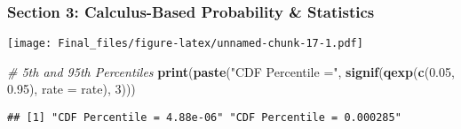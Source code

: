 \documentclass[
]{article}
\newenvironment{Shaded}{\begin{snugshade}}{\end{snugshade}}
\newcommand{\CommentTok}[1]{\textcolor[rgb]{0.56,0.35,0.01}{\textit{#1}}}
\newcommand{\DataTypeTok}[1]{\textcolor[rgb]{0.13,0.29,0.53}{#1}}
\newcommand{\DecValTok}[1]{\textcolor[rgb]{0.00,0.00,0.81}{#1}}
\newcommand{\FloatTok}[1]{\textcolor[rgb]{0.00,0.00,0.81}{#1}}
\newcommand{\KeywordTok}[1]{\textcolor[rgb]{0.13,0.29,0.53}{\textbf{#1}}}
\newcommand{\NormalTok}[1]{#1}
\newcommand{\OperatorTok}[1]{\textcolor[rgb]{0.81,0.36,0.00}{\textbf{#1}}}
\newcommand{\StringTok}[1]{\textcolor[rgb]{0.31,0.60,0.02}{#1}}
\begin{document}
\hypertarget{section-3-calculus-based-probability-statistics}{%
\subsubsection{Section 3: Calculus-Based Probability \&
Statistics}\label{section-3-calculus-based-probability-statistics}}

\begin{Shaded}
\end{Shaded}

\texttt{[image: Final\_files/figure-latex/unnamed-chunk-17-1.pdf]}

\begin{Shaded}
\begin{Highlighting}[]
\CommentTok{# 5th and 95th Percentiles }
\KeywordTok{print}\NormalTok{(}\KeywordTok{paste}\NormalTok{(}\StringTok{"CDF Percentile ="}\NormalTok{, }\KeywordTok{signif}\NormalTok{(}\KeywordTok{qexp}\NormalTok{(}\KeywordTok{c}\NormalTok{(}\FloatTok{0.05}\NormalTok{, }\FloatTok{0.95}\NormalTok{), }\DataTypeTok{rate =}\NormalTok{ rate), }\DecValTok{3}\NormalTok{)))}
\end{Highlighting}
\end{Shaded}

\begin{verbatim}
## [1] "CDF Percentile = 4.88e-06" "CDF Percentile = 0.000285"
\end{verbatim}

\begin{Shaded}
\end{Shaded}
\end{document}
